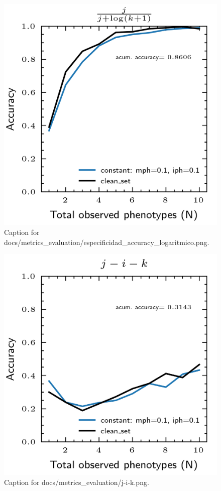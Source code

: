 \documentclass{article}
\begin{document}
\begin{figure}[h] \centering \includegraphics{docs/metrics_evaluation/especificidad_accuracy_logaritmico.png} \caption{Caption for docs/metrics_evaluation/especificidad_accuracy_logaritmico.png.} \end{figure}
\begin{figure}[h] \centering \includegraphics{docs/metrics_evaluation/j-i-k.png} \caption{Caption for docs/metrics_evaluation/j-i-k.png.} \end{figure}
\end{document}
